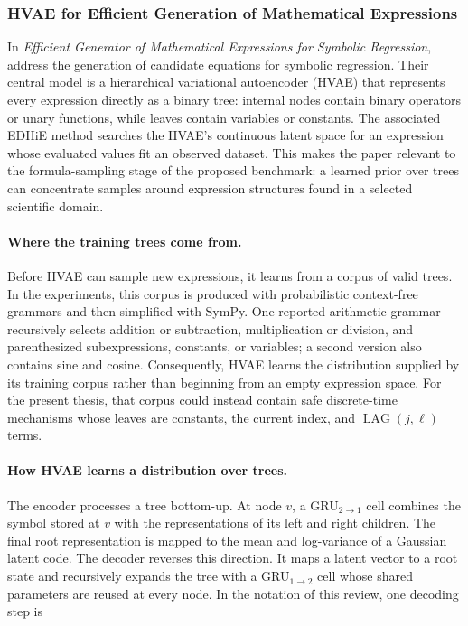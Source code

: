\subsubsection{HVAE for Efficient Generation of Mathematical Expressions}

In \emph{Efficient Generator of Mathematical Expressions for Symbolic
Regression}, \citet{meznar2023efficient} address the generation of candidate
equations for symbolic regression. Their central model is a hierarchical
variational autoencoder (HVAE) that represents every expression directly as a
binary tree: internal nodes contain binary operators or unary functions, while
leaves contain variables or constants. The associated EDHiE method searches
the HVAE's continuous latent space for an expression whose evaluated values
fit an observed dataset. This makes the paper relevant to the formula-sampling
stage of the proposed benchmark: a learned prior over trees can concentrate
samples around expression structures found in a selected scientific domain.

\paragraph{Where the training trees come from.}
Before HVAE can sample new expressions, it learns from a corpus of valid trees.
In the experiments, this corpus is produced with probabilistic context-free
grammars and then simplified with SymPy. One reported arithmetic grammar
recursively selects addition or subtraction, multiplication or division, and
parenthesized subexpressions, constants, or variables; a second version also
contains sine and cosine. Consequently, HVAE learns the distribution supplied
by its training corpus rather than beginning from an empty expression space.
For the present thesis, that corpus could instead contain safe discrete-time
mechanisms whose leaves are constants, the current index, and
$\operatorname{LAG}(j,\ell)$ terms.

\paragraph{How HVAE learns a distribution over trees.}
The encoder processes a tree bottom-up. At node $v$, a GRU$_{2\rightarrow1}$
cell combines the symbol stored at $v$ with the representations of its left and
right children. The final root representation is mapped to the mean and
log-variance of a Gaussian latent code. The decoder reverses this direction.
It maps a latent vector to a root state and recursively expands the tree with a
GRU$_{1\rightarrow2}$ cell whose shared parameters are reused at every node.
In the notation of this review, one decoding step is

